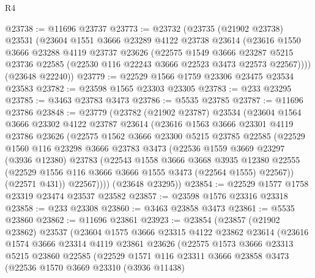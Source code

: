 \begin{lexlean}{R4}
\begin{coremodule}
@23738 := @11696 @23737
@23773 := @23732
    (@23735
      (@21902 @23738)
      @23531
      (@23604
        @1551
        @3666
        @23289
        @4122
        @23738
        @23614
        (@23616
          @1550
          @3666
          @23288
          @4119
          @23737
          @23626
          (@22575
            @1549
            @3666
            @23287
            @5215
            @23736
            @22585
            (@22530 @116 @22243 @3666 @22523 @3473 @22573 @22567))))
      (@23648 @22240))
@23779 := @22529 @1566 @1759 @23306 @23475 @23534 @23583
@23782 := @23598 @1565 @23303 @23305
@23783 := @233 @23295
@23785 := @3463 @23783 @3473
@23786 := @5535 @23785
@23787 := @11696 @23786
@23848 := @23779
    (@23782
      (@21902 @23787)
      @23534
      (@23604
        @1564
        @3666
        @23302
        @4122
        @23787
        @23614
        (@23616
          @1563
          @3666
          @23301
          @4119
          @23786
          @23626
          (@22575
            @1562
            @3666
            @23300
            @5215
            @23785
            @22585
            (@22529
              @1560
              @116
              @23298
              @3666
              @23783
              @3473
              (@22536
                @1559
                @3669
                @23297
                (@3936 @12380)
                @23783
                (@22543
                  @1558
                  @3666
                  @3668
                  @3935
                  @12380
                  @22555
                  (@22529 @1556 @116 @3666 @3666 @1555 @3473 (@22564 @1555) @22567))
                (@22571 @431))
              @22567))))
      (@23648 @23295))
@23854 := @22529 @1577 @1758 @23319 @23474 @23537 @23582
@23857 := @23598 @1576 @23316 @23318
@23858 := @233 @23308
@23860 := @3463 @23858 @3473
@23861 := @5535 @23860
@23862 := @11696 @23861
@23923 := @23854
    (@23857
      (@21902 @23862)
      @23537
      (@23604
        @1575
        @3666
        @23315
        @4122
        @23862
        @23614
        (@23616
          @1574
          @3666
          @23314
          @4119
          @23861
          @23626
          (@22575
            @1573
            @3666
            @23313
            @5215
            @23860
            @22585
            (@22529
              @1571
              @116
              @23311
              @3666
              @23858
              @3473
              (@22536
                @1570
                @3669
                @23310
                (@3936 @11438)

\end{coremodule}
\end{lexlean}
